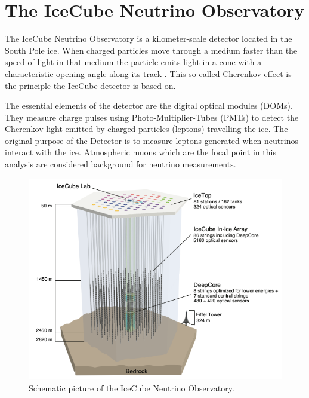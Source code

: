 \documentclass[
  tucolor,       %
  BCOR=12mm,     %
  parskip=half,  %
  open=any,      %
  cleardoublepage=plain,  %
]{tudothesis}
\begin{document}
\section{The IceCube Neutrino Observatory}
The IceCube Neutrino Observatory is a kilometer-scale detector located in the South Pole ice.
When charged particles move through a medium faster than the speed of light in that medium the particle emits light in a cone with a characteristic opening angle along its track \cite{Mikkelsen_2016}. This so-called Cherenkov effect is the principle the IceCube detector is based on.

The essential elements of the detector are the digital optical modules (DOMs). They measure charge pulses using Photo-Multiplier-Tubes (PMTs) to detect the Cherenkov light emitted by charged particles (leptons) travelling the ice.
The original purpose of the Detector is to measure leptons generated when neutrinos interact with the ice. Atmospheric muons which are the focal point in this analysis are considered background for neutrino measurements.
\begin{figure}
  \centering
  \includegraphics[scale=0.5]{Plots/IceCube schematic}
  \caption{Schematic picture of the IceCube Neutrino Observatory. \cite{Aartsen_2017}}
  \label{fig:IceCube schematic}
\end{figure}
\end{document}
